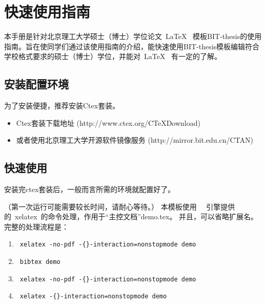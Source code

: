 
\chapter{快速使用指南}
\label{chap:what}

本手册是针对北京理工大学硕士（博士）学位论文~\LaTeX~ 模板BIT-thesis的使用指南。旨在使同学们通过该使用指南的介绍，能快速使用BIT-thesis模板编辑符合学校格式要求的硕士（博士）学位，并能对~\LaTeX~ 有一定的了解。


\section{安装配置环境}
\label{sec:requirements}

为了安装便捷，推荐安装Ctex套装。

\begin{itemize}
\item Ctex套装下载地址 
(http://www.ctex.org/CTeXDownload)

\item 或者使用北京理工大学开源软件镜像服务
(http://mirror.bit.edu.cn/CTAN)

\end{itemize}



\section{快速使用}
\label{sec:process}

安装完ctex套装后，一般而言所需的环境就配置好了。

（第一次运行可能需要较长时间，请耐心等待。）
本模板使用~\XeTeX~ 引擎提供的~xelatex~的命令处理，作用于“主控文档”demo.tex。
并且，可以省略扩展名。完整的处理流程是：

{\color{blue}
\begin{enumerate}
\item[] ~\verb|xelatex -no-pdf -{}-interaction=nonstopmode demo|
\item[] ~\verb|bibtex demo| 
\item[] ~\verb|xelatex -no-pdf -{}-interaction=nonstopmode demo|
\item[] ~\verb|xelatex -{}-interaction=nonstopmode demo|
\end{enumerate}}

